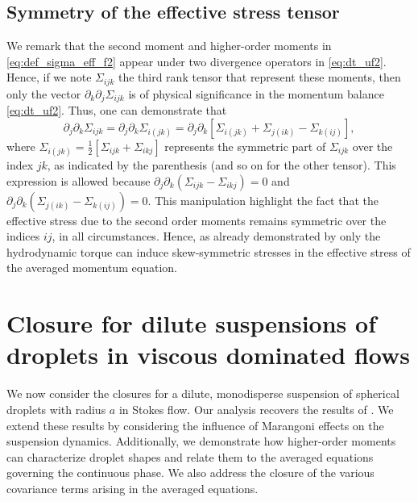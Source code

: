 \subsection{Symmetry of the effective stress tensor}
We remark that the second moment and higher-order moments in \ref{eq:def_sigma_eff_f2} appear under two divergence operators in \ref{eq:dt_uf2}. 
Hence, if we note $\Sigma_{ijk}$ the third rank tensor that represent these moments, then only the vector $\partial_k \partial_j\Sigma_{ijk}$ is of physical significance in the momentum balance \eqref{eq:dt_uf2}.
Thus, one can demonstrate that \citep{lhuillier1996contribution}
\begin{equation}
    \partial_j \partial_k \Sigma_{ijk}
    = \partial_j \partial_k \Sigma_{i(jk)}
    =
    \partial_j \partial_k \left[
        \Sigma_{i(jk)}
        + \Sigma_{j(ik)}
        - \Sigma_{k(ij)}
    \right],
    \label{eq:sym_proof}
\end{equation}
where $\Sigma_{i(jk)} = \frac{1}{2}[\Sigma_{ijk} + \Sigma_{ikj}]$ represents the symmetric part of $\Sigma_{ijk}$ over the index $jk$, as indicated by the parenthesis (and so on for the other tensor). 
This expression is allowed because $\partial_j \partial_k (\Sigma_{ijk} - \Sigma_{ikj}) = 0$ and $\partial_j \partial_k (\Sigma_{j(ik)} - \Sigma_{k(ij)}) = 0$. 
This manipulation highlight the fact that the effective stress due to the second order moments remains symmetric over the indices $ij$, in all circumstances.
Hence, as already demonstrated by \citet{lhuillier1996contribution} only the hydrodynamic torque can induce skew-symmetric stresses in the effective stress of the averaged momentum equation. 



\section{Closure for dilute suspensions of droplets in viscous dominated flows}
We now consider the closures for a dilute, monodisperse suspension of spherical droplets with radius $a$ in Stokes flow. %
Our analysis recovers the results of \citet[Appendix B]{zhang1997momentum}. 
We extend these results by considering the influence of Marangoni effects on the suspension dynamics. 
Additionally, we demonstrate how higher-order moments can characterize droplet shapes and relate them to the averaged equations governing the continuous phase. 
We also address the closure of the various covariance terms arising in the averaged equations.


